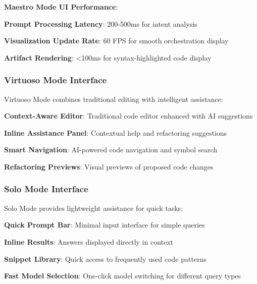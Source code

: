 \begin{alertbox}
\textbf{Maestro Mode UI Performance}:
\begin{compactlist}
    \item \textbf{Prompt Processing Latency}: 200-500ms for intent analysis
    \item \textbf{Visualization Update Rate}: 60 FPS for smooth orchestration display
    \item \textbf{Artifact Rendering}: <100ms for syntax-highlighted code display
\end{compactlist}
\end{alertbox}

\subsubsection*{Virtuoso Mode Interface}

Virtuoso Mode combines traditional editing with intelligent assistance:

\begin{compactlist}
    \item \textbf{Context-Aware Editor}: Traditional code editor enhanced with AI suggestions
    \item \textbf{Inline Assistance Panel}: Contextual help and refactoring suggestions
    \item \textbf{Smart Navigation}: AI-powered code navigation and symbol search
    \item \textbf{Refactoring Previews}: Visual previews of proposed code changes
\end{compactlist}

\subsubsection*{Solo Mode Interface}

Solo Mode provides lightweight assistance for quick tasks:

\begin{compactlist}
    \item \textbf{Quick Prompt Bar}: Minimal input interface for simple queries
    \item \textbf{Inline Results}: Answers displayed directly in context
    \item \textbf{Snippet Library}: Quick access to frequently used code patterns
    \item \textbf{Fast Model Selection}: One-click model switching for different query types
\end{compactlist}

